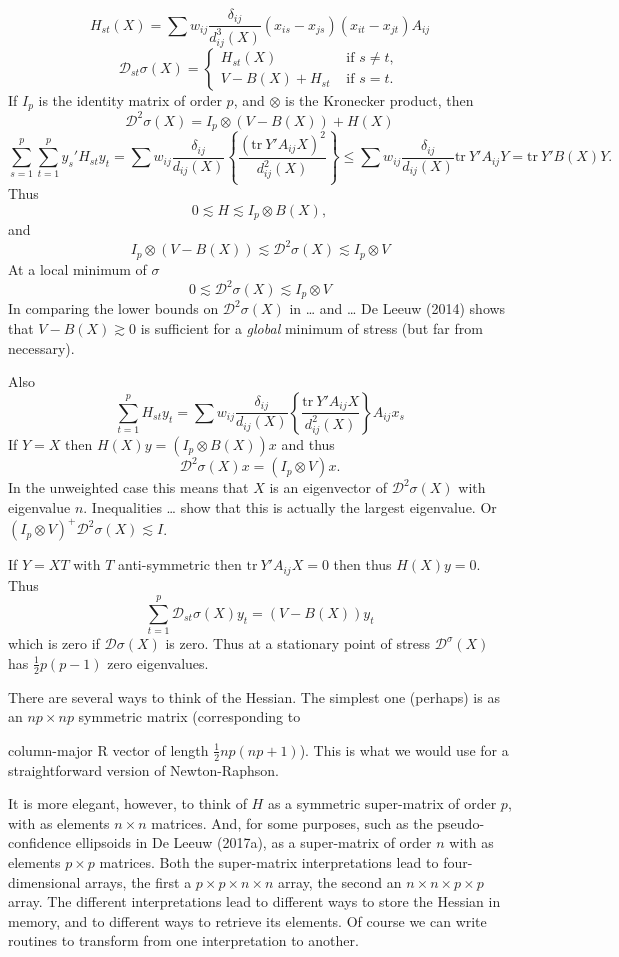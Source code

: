 \documentclass[
  12pt,
]{article}
\begin{document}
\[
H_{st}(X)=\sum   w_{ij}\frac{\delta_{ij}}{d_{ij}^3(X)}(x_{is}-x_{js})(x_{it}-x_{jt})A_{ij}
\]
\[
\mathcal{D}_{st}\sigma(X)=\begin{cases}H_{st}(X)&\text{ if }s\not= t,\\
V-B(X)+H_{st}&\text{ if }s= t.
\end{cases}
\]
If \(I_p\) is the identity matrix of order \(p\), and \(\otimes\) is the Kronecker
product, then
\[
\mathcal{D}^2\sigma(X)=I_p\otimes(V - B(X))+ H(X)
\]
\[
\sum_{s=1}^p\sum_{t=1}^p y_s'H_{st}y_t=\sum w_{ij}\frac{\delta_{ij}}{d_{ij}(X)}\left\{\frac{(\text{tr} \ Y'A_{ij}X)^2}{d_{ij}^2(X)}\right\}\leq\sum w_{ij}\frac{\delta_{ij}}{d_{ij}(X)}\text{tr}\ Y'A_{ij}Y=\text{tr}\ Y'B(X)Y.
\]
Thus
\[
0\lesssim H\lesssim I_p\otimes B(X),
\]
and
\[
I_p\otimes (V-B(X))\lesssim\mathcal{D}^2\sigma(X)\lesssim I_p\otimes V
\]
At a local minimum of \(\sigma\)
\[
0\lesssim\mathcal{D}^2\sigma(X)\lesssim I_p\otimes V
\]
In comparing the lower bounds on \(\mathcal{D}^2\sigma(X)\) in \ldots{} and \ldots{} De Leeuw (2014) shows that \(V-B(X)\gtrsim 0\) is sufficient for a \emph{global} minimum of stress (but far from necessary).

Also
\[
\sum_{t=1}^p H_{st}y_t=\sum w_{ij}\frac{\delta_{ij}}{d_{ij}(X)}\left\{\frac{\text{tr}\ Y'A_{ij}X }{d_{ij}^2(X)}\right\}A_{ij}x_s
\]
If \(Y=X\) then \(H(X)y=(I_p\otimes B(X))x\) and thus
\[\mathcal{D}^2\sigma(X)x=(I_p\otimes V)x.\] In the unweighted case this means
that \(X\) is an eigenvector of \(\mathcal{D}^2\sigma(X)\) with eigenvalue \(n\).
Inequalities \ldots{} show that this is actually the largest eigenvalue. Or
\((I_p\otimes V)^+\mathcal{D}^2\sigma(X)\lesssim I\).

If \(Y=XT\) with \(T\) anti-symmetric then
\(\text{tr}\ Y'A_{ij}X=0\) then thus \(H(X)y=0\). Thus
\[
\sum_{t=1}^p\mathcal{D}_{st}\sigma(X)y_t=(V-B(X))y_t
\]
which is zero if \(\mathcal{D}\sigma(X)\) is zero. Thus at a stationary point of stress
\(\mathcal{D}^\sigma(X)\) has \(\frac12p(p-1)\) zero eigenvalues.

There are several ways to think of the Hessian. The simplest one
(perhaps) is as an \(np\times np\) symmetric matrix (corresponding to

column-major R vector of length \(\frac12 np(np+1)\)). This is what we
would use for a straightforward version of Newton-Raphson.

It is more elegant, however, to think of \(H\) as a symmetric super-matrix
of order \(p\), with as elements \(n\times n\) matrices. And, for some
purposes, such as the pseudo-confidence ellipsoids in De Leeuw (2017a), as
a super-matrix of order \(n\) with as elements \(p\times p\) matrices. Both
the super-matrix interpretations lead to four-dimensional arrays, the
first a \(p\times p\times n\times n\) array, the second an
\(n\times n\times p\times p\) array. The different interpretations lead to
different ways to store the Hessian in memory, and to different ways to
retrieve its elements. Of course we can write routines to transform from
one interpretation to another.
\end{document}
